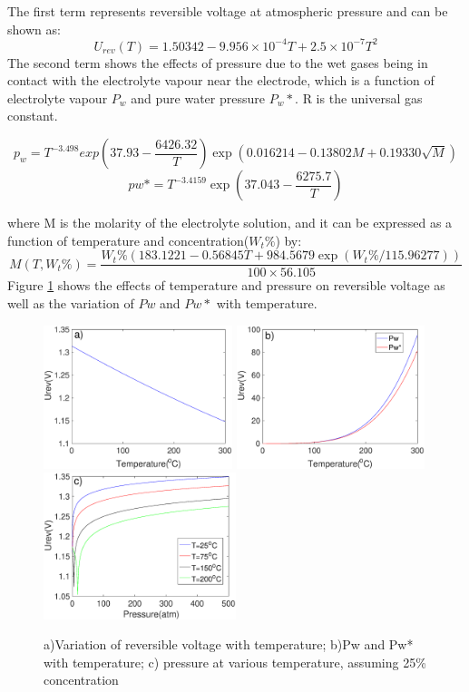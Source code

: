 \documentclass[11pt, a4paper]{article}
\begin{document}
The first term represents reversible voltage at atmospheric pressure and can be shown as:\cite{reversible}
\begin{equation} 
U_{rev}(T)=1.50342-9.956 \times 10^{-4}T+2.5 \times10^{-7}T^2
\end{equation} 
 The second term shows the effects of pressure due to the wet gases being in contact with the electrolyte vapour near the electrode, which is a function of electrolyte vapour $P_w$ and pure water pressure $P_w*$. R is the universal gas constant.\cite{reversible}
 \begin{singlespace}

 \begin{equation} 
p_w=T^{-3.498} exp(37.93-\frac{6426.32} {T} )\exp(0.016214 - 0.13802M+0.19330\sqrt{M} ) 
\end{equation} 
\begin{equation}
pw*=T^{-3.4159} \exp(37.043-\frac{6275.7} {T} ) 
\end{equation} 
\end{singlespace}
where M is the molarity of the electrolyte solution, and it can be expressed as a function of temperature and  concentration($W_t\%$) by:\cite{reversible}
\begin{equation} 
M(T, W_t\%) =\frac{W_t\%(183.1221-0.56845T+984.5679 \exp(W_t\%/115.96277))} {100\times56.105} 
\end{equation} 
Figure \ref{fig:Urev} shows the effects of temperature and pressure on reversible voltage as well as the variation of $Pw$ and $Pw*$ with temperature. 
\begin{figure} 
\includegraphics[width=5.5cm]{temperature.eps} 
\includegraphics[width=5.5cm]{pw.eps} 
\includegraphics[width=5.6cm] {pressure.eps} 
\caption{a)Variation of reversible voltage with temperature; b)Pw and Pw* with temperature; c) pressure at various temperature, assuming 25\% concentration} 
\label{fig:Urev}
\end{figure} 
\end{document}
